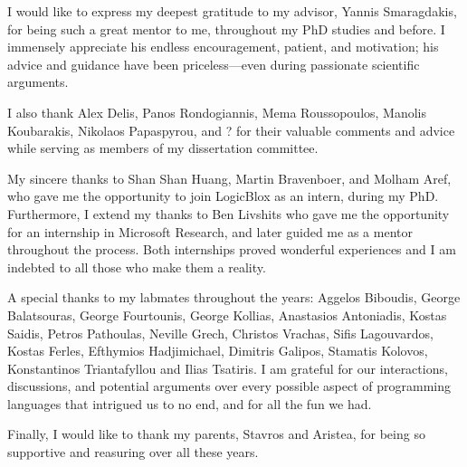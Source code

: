 I would like to express my deepest gratitude to my advisor, Yannis Smaragdakis, for being such a great mentor to me, throughout my PhD studies and before. I immensely appreciate his endless encouragement, patient, and motivation; his advice and guidance have been priceless---even during passionate scientific arguments.

I also thank Alex Delis, Panos Rondogiannis, Mema Roussopoulos, Manolis Koubarakis, Nikolaos Papaspyrou, and ? for their valuable comments and advice while serving as members of my dissertation committee.

My sincere thanks to Shan Shan Huang, Martin Bravenboer, and Molham Aref, who gave me the opportunity to join LogicBlox as an intern, during my PhD. Furthermore, I extend my thanks to Ben Livshits who gave me the opportunity for an internship in Microsoft Research, and later guided me as a mentor throughout the process. Both internships proved wonderful experiences and I am indebted to all those who make them a reality.

A special thanks to my labmates throughout the years: Aggelos Biboudis, George Balatsouras, George Fourtounis, George Kollias, Anastasios Antoniadis, Kostas Saidis, Petros Pathoulas, Neville Grech, Christos Vrachas, Sifis Lagouvardos, Kostas Ferles, Efthymios Hadjimichael, Dimitris Galipos, Stamatis Kolovos, Konstantinos Triantafyllou and Ilias Tsatiris. I am grateful for our interactions, discussions, and potential arguments over every possible aspect of programming languages that intrigued us to no end, and for all the fun we had.

Finally, I would like to thank my parents, Stavros and Aristea, for being so supportive and reasuring over all these years.